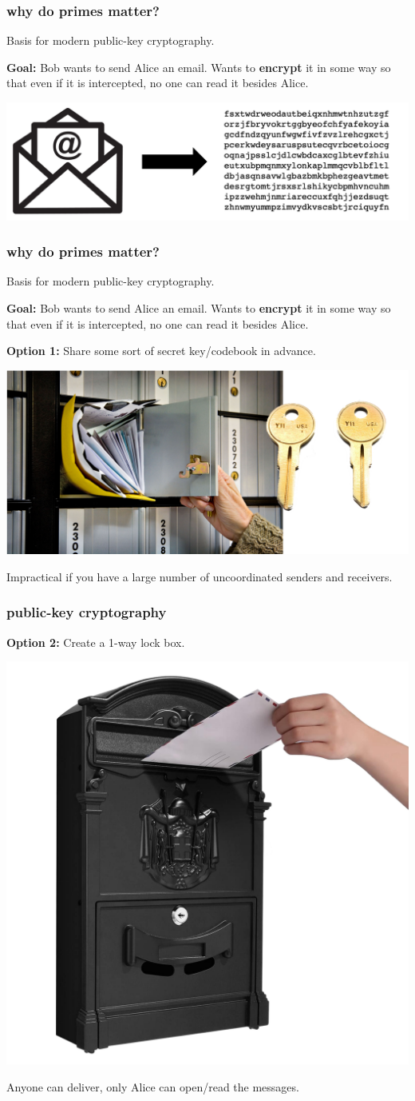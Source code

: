\documentclass[compress]{beamer}
\begin{document}
\begin{frame}
	\frametitle{why do primes matter?}
	Basis for modern public-key cryptography.
	
	\textbf{Goal:} Bob wants to send Alice an email. Wants to \textbf{\alert{encrypt}} it in some way so that even if it is intercepted, no one can read it besides Alice.
	
	\begin{center}
		\includegraphics[width=.9\textwidth]{encrypted_message.png}
	\end{center}
\end{frame}

\begin{frame}
	\frametitle{why do primes matter?}
	Basis for modern public-key cryptography.
	
	\textbf{Goal:} Bob wants to send Alice an email. Wants to \textbf{\alert{encrypt}} it in some way so that even if it is intercepted, no one can read it besides Alice.
	
	\textbf{Option 1:} Share some sort of secret key/codebook in advance.
	\begin{center}
		\includegraphics[width=.6\textwidth]{share_key.png}
	\end{center}
	Impractical if you have a large number of uncoordinated senders and receivers. 
\end{frame}

\begin{frame}
	\frametitle{ public-key cryptography}
	\textbf{Option 2:} Create a 1-way lock box.
	\begin{center}
		\includegraphics[width=.4\textwidth]{locking_mailbox.png}
	\end{center}
	Anyone can deliver, only Alice can open/read the messages.
\end{frame}
\end{document}
